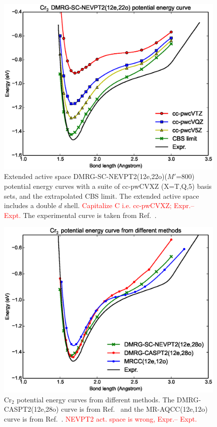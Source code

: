 \begin{figure}
  \centering
  \includegraphics[width=1.1\columnwidth]{Cr2-dmrg-nevpt2.eps}
  \caption{Extended active space DMRG-SC-NEVPT2(12e,22o)($M'$=800) potential energy curves with a suite of cc-pwCVXZ (X=T,Q,5) basis sets,
    and the extrapolated CBS limit. The extended active space includes a double $d$ shell. \textcolor{red}{Capitalize C i.e. cc-pwCVXZ; Expr.-- Expt.}
The experimental curve is taken from Ref.~.}
  \label{fig:dmrg-nevpt2}
\end{figure}
\begin{figure}
  \includegraphics[width=1.5\columnwidth]{Cr2-curves.eps}
  \caption{Cr$_2$ potential energy curves from different methods.  The DMRG-CASPT2(12e,28o) curve is from Ref.~ and the MR-AQCC(12e,12o) curve is from Ref.~. \textcolor{red}{NEVPT2 act. space is wrong, Expr.-- Expt.}}
  \label{fig:compare}
\end{figure}


